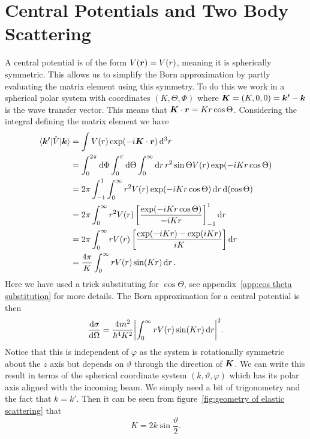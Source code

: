 \documentclass[a4paper]{article}
\renewcommand{\ket}[1]{\vert {#1} \rangle}
\renewcommand{\bra}[1]{\langle {#1} \vert}
\begin{document}
    \section{Central Potentials and Two Body Scattering}
    A central potential is of the form \(V(\bm{r}) = V(r)\), meaning it is spherically symmetric.
    This allows us to simplify the Born approximation by partly evaluating the matrix element using this symmetry.
    To do this we work in a spherical polar system with coordinates \((K, \Theta, \Phi)\) where \(\bm{K} = (K, 0, 0) = \bm{k'} - \bm{k}\) is the wave transfer vector.
    This means that \(\bm{K}\cdot\bm{r} = Kr\cos\Theta\).
    Considering the integral defining the matrix element we have
    \begin{align*}
        \bra{\vv{k'}} \operator{V} \ket{\vv{k}} &= \int V(r) \exp(-i\vv{K}\cdot\vv{r}) \dd[3]{r}\\
        &= \int_{0}^{2\pi} \dd{\Phi} \int_{0}^{\pi} \dd{\Theta} \int_{0}^{\infty} \dd{r} r^2 \sin\Theta V(r) \exp(-iKr\cos\Theta)\\
        &= 2\pi \int_{-1}^{1} \int_{0}^{\infty} r^2 V(r) \exp(-iKr\cos\Theta) \dd{r} \dd{(\cos\Theta)}\\
        &= 2\pi \int_{0}^{\infty} r^2V(r) \left[ \frac{\exp(-iKr\cos\Theta)}{-iKr} \right]_{-1}^{1} \dd{r}\\
        &= 2\pi \int_{0}^{\infty } rV(r) \left[ \frac{\exp(-iKr) - \exp(iKr)}{iK} \right] \dd{r}\\
        &= \frac{4\pi}{K} \int_{0}^{\infty} r V(r) \sin(K r) \dd{r}.
    \end{align*}
    Here we have used a trick substituting for \(\cos\Theta\), see appendix~\ref{app:cos theta substitution} for more details.
    The Born approximation for a central potential is then
    \[\dv{\sigma}{\Omega} = \frac{4m^2}{\hbar^4K^2} \abs{\int_{0}^{\infty} rV(r) \sin(Kr) \dd{r}}^2.\]
    Notice that this is independent of \(\varphi\) as the system is rotationally symmetric about the \(z\) axis but depends on \(\vartheta\) through the direction of \(\bm{K}\).
    We can write this result in terms of the spherical coordinate system \((k, \vartheta, \varphi)\) which has its polar axis aligned with the incoming beam.
    We simply need a bit of trigonometry and the fact that \(k = k'\).
    Then it can be seen from figure~\ref{fig:geometry of elastic scattering} that
    \[K = 2k\sin\frac{\vartheta}{2}.\]
\end{document}
